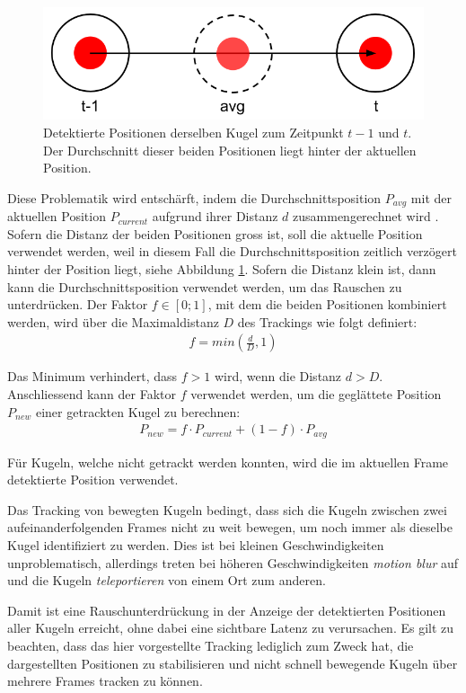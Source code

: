 \begin{figure}[h!]
    \begin{center}
        \includegraphics[width=0.6\linewidth]{../common/03_billiard_ai/resources/tracking_moving_average_for_moving_balls.png}
    \end{center}
    \caption{Detektierte Positionen derselben Kugel zum Zeitpunkt $t-1$ und $t$. Der Durchschnitt dieser beiden Positionen liegt hinter der aktuellen Position.}
    \label{fig:tracking_moving_average_for_moving_balls}
\end{figure}

Diese Problematik wird entschärft, indem die Durchschnittsposition $P_{avg}$ mit der aktuellen Position $P_{current}$
aufgrund ihrer Distanz $d$ zusammengerechnet wird \cite{learnopencv:stabilizing_landmarks_in_videos}.
Sofern die Distanz der beiden Positionen gross ist, soll die aktuelle Position verwendet werden, weil in diesem Fall
die Durchschnittsposition zeitlich verzögert hinter der Position liegt, siehe Abbildung \ref{fig:tracking_moving_average_for_moving_balls}.
Sofern die Distanz klein ist, dann kann die Durchschnittsposition verwendet werden, um das Rauschen zu unterdrücken.
Der Faktor $f \in [0; 1]$, mit dem die beiden Positionen kombiniert werden, wird über die Maximaldistanz $D$ des Trackings wie folgt definiert:
\begin{align}
    f = min(\frac{d}{D}, 1)
\end{align}

Das Minimum verhindert, dass $f > 1$ wird, wenn die Distanz $d > D$.
Anschliessend kann der Faktor $f$ verwendet werden, um die geglättete Position $P_{new}$ einer getrackten Kugel zu berechnen:
\begin{align}
    P_{new} = f \cdot P_{current} + (1 - f) \cdot P_{avg}
\end{align}

Für Kugeln, welche nicht getrackt werden konnten, wird die im aktuellen Frame detektierte Position verwendet.

Das Tracking von bewegten Kugeln bedingt, dass sich die Kugeln zwischen zwei aufeinanderfolgenden Frames nicht zu weit
bewegen, um noch immer als dieselbe Kugel identifiziert zu werden.
Dies ist bei kleinen Geschwindigkeiten unproblematisch, allerdings treten bei höheren Geschwindigkeiten
\emph{motion blur} auf und die Kugeln \emph{teleportieren} von einem Ort zum anderen.

Damit ist eine Rauschunterdrückung in der Anzeige der detektierten Positionen aller Kugeln erreicht, ohne dabei eine
sichtbare Latenz zu verursachen.
Es gilt zu beachten, dass das hier vorgestellte Tracking lediglich zum Zweck hat, die dargestellten Positionen zu stabilisieren
und nicht schnell bewegende Kugeln über mehrere Frames tracken zu können.

